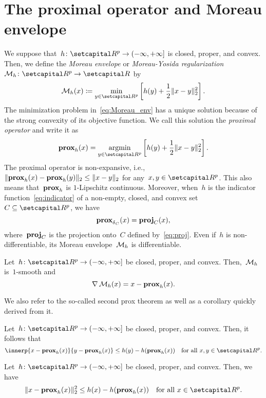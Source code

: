 \documentclass[../main]{subfiles}
\begin{document}
\section{The proximal operator and Moreau envelope}
We suppose that~$h \colon \setR^p \to (-\infty, +\infty]$ is closed, proper, and convex.
Then, we define the \emph{Moreau envelope} or \emph{Moreau-Yosida regularization}~$\envelope_h \colon \setR^p \to \setR$ by
\[ \label{eq:Moreau_env}
    \envelope_h(x) \coloneqq \min_{y \in \setR^p} \left[ h(y) + \frac{1}{2} \norm{x - y}_2^2 \right] 
.\] 
The minimization problem in~\cref{eq:Moreau_env} has a unique solution because of the strong convexity of its objective function.
We call this solution the \emph{proximal operator} and write it as
\[ \label{eq:prox}
    \prox_h(x) = \argmin_{y \in \setR^p} \left[ h(y) + \frac{1}{2} \norm{x - y}_2^2 \right] 
.\] 
The proximal operator is non-expansive, i.e.,~$\lVert\operatorname{\mathbf{prox}}_h(x) - \operatorname{\mathbf{prox}}_h(y)\rVert_2 \le \lVert x - y\rVert_2$ for any~$x, y \in \setR^p$.
This also means that~$\operatorname{\mathbf{prox}}_h$ is $1$-Lipschitz continuous.
Moreover, when~$h$ is the indicator function~\cref{eq:indicator} of a non-empty, closed, and convex set~$C \subseteq \setR^p$, we have
\[ \label{eq:prox_ind}
    \operatorname{\mathbf{prox}}_{\operatorname{\delta}_C}(x) = \operatorname{\mathbf{proj}}_C(x)
,\] 
where~$\operatorname{\mathbf{proj}}_C$ is the projection onto~$C$ defined by~\cref{eq:proj}.
Even if~$h$ is non-differentiable, its Moreau envelope~$\operatorname{\mathcal{M}}_h$ is differentiable.
\begin{theorem} \label{thm:Moreau_smooth}
    Let~$h \colon \setR^p \to (-\infty, +\infty]$ be closed, proper, and convex.
    Then,~$\operatorname{\mathcal{M}}_h$ is~$1$-smooth and
    \[
        \nabla \operatorname{\mathcal{M}}_h(x) = x - \operatorname{\mathbf{prox}}_h(x)
    .\] 
\end{theorem}
We also refer to the so-called second prox theorem as well as a corollary quickly derived from it.
\begin{theorem} \label{thm:second_prox}
    Let~$h \colon \setR^p \to (-\infty, +\infty]$ be closed, proper, and convex.
    Then, it follows that
    \[
        \innerp{x - \prox_h(x)}{y - \prox_h(x)} \le h(y) - h(\prox_h(x)) \forallcondition{x, y \in \setR^p}
    .\] 
\end{theorem}
\begin{corollary} \label{thm:second_prox_col}
    Let~$h \colon \setR^p \to (-\infty, +\infty]$ be closed, proper, and convex.
    Then, we have
    \[
        \norm{x - \prox_h(x)}_2^2 \le h(x) - h(\prox_h(x)) \forallcondition{x \in \setR^p}
    .\] 
\end{corollary}
\end{document}
